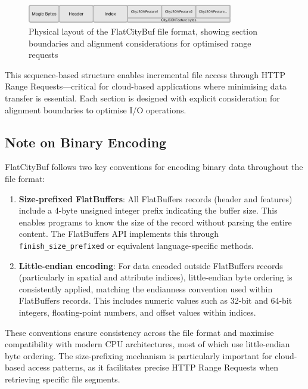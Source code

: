 \begin{figure}[h]
  \centering
  \includegraphics[width=0.8\textwidth]{figs/methodology/file_structure.png}
  \caption{Physical layout of the FlatCityBuf file format, showing section boundaries and alignment considerations for optimised range requests}
  \label{fig:methodology:file-structure}
\end{figure}

This sequence-based structure enables incremental file access through HTTP Range Requests—critical for cloud-based applications where minimising data transfer is essential. Each section is designed with explicit consideration for alignment boundaries to optimise I/O operations.

\subsection{Note on Binary Encoding}
\label{methodology:overview:note_on_binary_encoding}
FlatCityBuf follows two key conventions for encoding binary data throughout the file format:

\begin{enumerate}
  \item \textbf{Size-prefixed FlatBuffers}: All FlatBuffers records (header and features) include a 4-byte unsigned integer prefix indicating the buffer size. This enables programs to know the size of the record without parsing the entire content. The FlatBuffers API implements this through \texttt{finish\_size\_prefixed} or equivalent language-specific methods.
  \item \textbf{Little-endian encoding}: For data encoded outside FlatBuffers records (particularly in spatial and attribute indices), little-endian byte ordering is consistently applied, matching the endianness convention used within FlatBuffers records. This includes numeric values such as 32-bit and 64-bit integers, floating-point numbers, and offset values within indices.
\end{enumerate}

These conventions ensure consistency across the file format and maximise compatibility with modern CPU architectures, most of which use little-endian byte ordering. The size-prefixing mechanism is particularly important for cloud-based access patterns, as it facilitates precise HTTP Range Requests when retrieving specific file segments.
